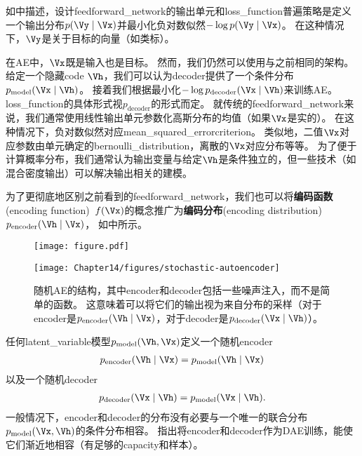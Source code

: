 如中描述，设计\gls{feedforward_network}的输出单元和\gls{loss_function}普遍策略是定义一个输出分布$p(\Vy \mid \Vx) $并最小化负对数似然$-\log p(\Vy \mid \Vx)$。
在这种情况下，$\Vy$是关于目标的向量（如类标）。


在\gls{AE}中，$\Vx$既是输入也是目标。
然而，我们仍然可以使用与之前相同的架构。
给定一个隐藏\gls{code} $\Vh$，我们可以认为\gls{decoder}提供了一个条件分布$p_{\text{model}}(\Vx \mid \Vh)$。
接着我们根据最小化$-\log p_{\text{decoder}}(\Vx \mid \Vh)$来训练\gls{AE}。
\gls{loss_function}的具体形式视$p_{\text{decoder}}$的形式而定。
就传统的\gls{feedforward_network}来说，我们通常使用线性输出单元参数化高斯分布的均值（如果$\Vx$是实的）。
在这种情况下，负对数似然对应\gls{mean_squared_error}\gls{criterion}。
类似地，二值$\Vx$对应参数由单元确定的\gls{bernoulli_distribution}，离散的$\Vx$对应分布等等。
为了便于计算概率分布，我们通常认为输出变量与给定$\Vh$是条件独立的，但一些技术（如混合密度输出）可以解决输出相关的建模。


为了更彻底地区别之前看到的\gls{feedforward_network}，我们也可以将\textbf{编码函数}(encoding function)~$f(\Vx)$的概念推广为\textbf{编码分布}(encoding distribution)~$ p_{\text{encoder}}(\Vh \mid \Vx)$， 如中所示。

\begin{figure}[!htb]
\ifOpenSource
\centerline{\texttt{[image: figure.pdf]}}
\else
\centerline{\texttt{[image: Chapter14/figures/stochastic-autoencoder]}}
\fi
\caption{随机\gls{AE}的结构，其中\gls{encoder}和\gls{decoder}包括一些噪声注入，而不是简单的函数。
这意味着可以将它们的输出视为来自分布的采样（对于\gls{encoder}是$p_{\text{encoder}}(\Vh \mid \Vx)$，对于\gls{decoder}是$p_{\text{decoder}}(\Vx\mid \Vh)$）。}
\label{fig:chap14_stochastic-autoencoder}
\end{figure}

任何\gls{latent_variable}模型$p_{\text{model}}(\Vh, \Vx)$定义一个随机\gls{encoder}
\begin{align}
p_{\text{encoder}}(\Vh \mid \Vx) = p_{\text{model}}(\Vh\mid\Vx)
\end{align}
以及一个随机\gls{decoder}
\begin{align}
p_{\text{decoder}}(\Vx \mid \Vh) = p_{\text{model}}(\Vx\mid\Vh).
\end{align}
一般情况下，\gls{encoder}和\gls{decoder}的分布没有必要与一个唯一的联合分布$p_{\text{model}}(\Vx, \Vh)$的条件分布相容。
\citet{Alain-et-al-arxiv2015}指出将\gls{encoder}和\gls{decoder}作为\gls{DAE}训练，能使它们渐近地相容（有足够的\gls{capacity}和样本）。



